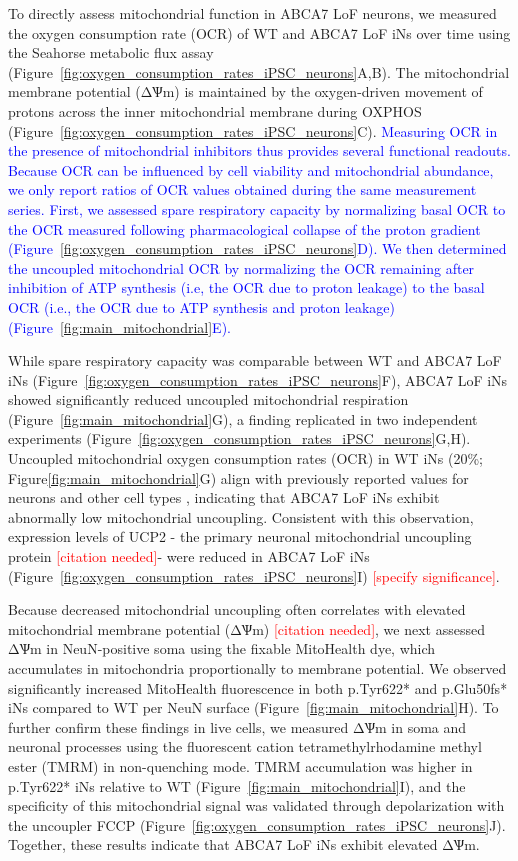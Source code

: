 To directly assess mitochondrial function in ABCA7 LoF neurons, we measured the oxygen consumption rate (OCR) of WT and ABCA7 LoF iNs over time using the Seahorse metabolic flux assay (Figure~\ref{fig:oxygen_consumption_rates_iPSC_neurons}A,B). The mitochondrial membrane potential (ΔѰm) is maintained by the oxygen-driven movement of protons across the inner mitochondrial membrane during OXPHOS (Figure~\ref{fig:oxygen_consumption_rates_iPSC_neurons}C). \newcommand{\quoteC}{\textcolor{blue}{Measuring OCR in the presence of mitochondrial inhibitors thus provides several functional readouts. Because OCR can be influenced by cell viability and mitochondrial abundance\cite{Divakaruni2014-eq,Gu2021-ms}, we only report ratios of OCR values obtained during the same measurement series. First, we assessed spare respiratory capacity by normalizing basal OCR to the OCR measured following pharmacological collapse of the proton gradient (Figure~\ref{fig:oxygen_consumption_rates_iPSC_neurons}D). We then determined the uncoupled mitochondrial OCR by normalizing the OCR remaining after inhibition of ATP synthesis (i.e, the OCR due to proton leakage) to the basal OCR (i.e., the OCR due to ATP synthesis and proton leakage)(Figure~\ref{fig:main_mitochondrial}E).\label{quoteC-label}}}
\quoteC

While spare respiratory capacity was comparable between WT and ABCA7 LoF iNs (Figure~\ref{fig:oxygen_consumption_rates_iPSC_neurons}F), ABCA7 LoF iNs showed significantly reduced uncoupled mitochondrial respiration (Figure~\ref{fig:main_mitochondrial}G), a finding replicated in two independent experiments (Figure~\ref{fig:oxygen_consumption_rates_iPSC_neurons}G,H). Uncoupled mitochondrial oxygen consumption rates (OCR) in WT iNs (20\%; Figure\ref{fig:main_mitochondrial}G) align with previously reported values for neurons and other cell types \cite{Divakaruni2011-uj,Jekabsons2004-fn}, indicating that ABCA7 LoF iNs exhibit abnormally low mitochondrial uncoupling. Consistent with this observation, expression levels of UCP2 - the primary neuronal mitochondrial uncoupling protein \textcolor{red}{[citation needed]}- were reduced in ABCA7 LoF iNs (Figure~\ref{fig:oxygen_consumption_rates_iPSC_neurons}I) \textcolor{red}{[specify significance]}. 

Because decreased mitochondrial uncoupling often correlates with elevated mitochondrial membrane potential (ΔѰm) \textcolor{red}{[citation needed]}, we next assessed ΔѰm in NeuN-positive soma using the fixable MitoHealth dye, which accumulates in mitochondria proportionally to membrane potential. We observed significantly increased MitoHealth fluorescence in both p.Tyr622* and p.Glu50fs* iNs compared to WT per NeuN surface (Figure~\ref{fig:main_mitochondrial}H). To further confirm these findings in live cells, we measured ΔѰm in soma and neuronal processes using the fluorescent cation tetramethylrhodamine methyl ester (TMRM) in non-quenching mode. TMRM accumulation was higher in p.Tyr622* iNs relative to WT (Figure~\ref{fig:main_mitochondrial}I), and the specificity of this mitochondrial signal was validated through depolarization with the uncoupler FCCP (Figure~\ref{fig:oxygen_consumption_rates_iPSC_neurons}J). Together, these results indicate that ABCA7 LoF iNs exhibit elevated ΔѰm. 

